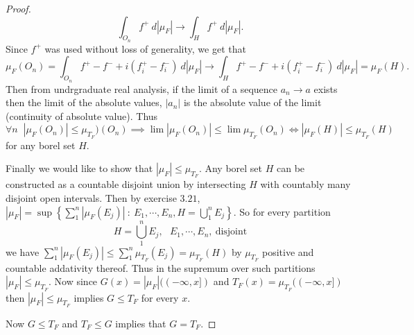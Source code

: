 \documentclass[11pt]{amsart}
\theoremstyle{definition}
\numberwithin{theorem}{section}
\numberwithin{definition}{section}
\numberwithin{equation}{section}
\begin{document}
\begin{proof}
\begin{equation*}
	\int_{O_n} f^+\ d|\mu_F| \to \int_{H} f^+\ d|\mu_F|.
\end{equation*}
Since $f^+$ was used without loss of generality, we get that
\begin{equation*}
	\mu_F(O_n) = \int_{O_n} f^+ - f^- + i(f^+_i - f^-_i)\ d|\mu_F| \to  \int_H f^+ - f^- + i(f^+_i - f^-_i)\ d|\mu_F| = \mu_F(H).
\end{equation*}
Then from undrgraduate real analysis, if the limit of a sequence $a_n \to a$ exists then the limit of the absolute values, $|a_n|$ is the absolute value of the limit (continuity of absolute value). Thus
\begin{equation*}
	\forall n\;\;|\mu_F(O_n)| \leq \mu_{T_F})(O_n) \implies \lim |\mu_F(O_n)| \leq \lim \mu_{T_F}(O_n) \iff |\mu_F(H)| \leq \mu_{T_F}(H)
\end{equation*}
for any borel set $H.$

Finally we would like to show that $|\mu_F| \leq \mu_{T_F}$. Any borel set $H$ can be constructed as a
countable disjoint union by intersecting $H$ with countably many disjoint open intervals. Then by exercise $3.21$,  $|\mu_F| = \sup\left\{\sum_1^n |\mu_F(E_j)|\ :\ E_1, \cdots, E_n, H = \bigcup_1^n E_j \right\}$. So for every partition
\begin{equation*}
	 H = \bigcup_1^n E_j,\ \ \ E_1, \cdots, E_n,\ \text{disjoint}
\end{equation*}
 we have  $\sum_1^n |\mu_F(E_j)| \leq \sum_1^n \mu_{T_F}(E_j) =\mu_{T_F}(H) $ by $\mu_{T_F}$ positive and countable addativity thereof. Thus in the supremum over such partitions $|\mu_F| \leq \mu_{T_F}$. Now since $G(x) = |\mu_F|((-\infty, x])$ and $T_F(x) = \mu_{T_F}((-\infty, x])$ then $|\mu_F| \leq \mu_{T_F} $ implies $G \leq T_F$ for every $x$.

 Now $G \leq T_F$ and $T_F \leq G$ implies that $G = T_F$.
\end{proof}
\end{document}

